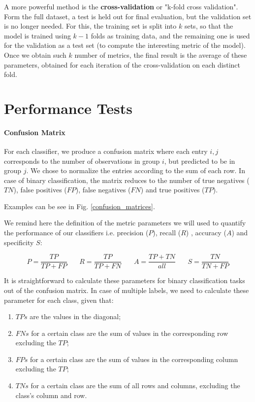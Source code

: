 \documentclass{article}
\begin{document}
A more powerful method is the \textbf{cross-validation} or "k-fold cross validation". Form the full dataset, a test is held out for final evaluation, but the validation set is no longer needed. For this, the training set is split into $k$ sets, so that the model is trained using $k-1$ folds as training data, and the remaining one is used for the validation as a test set (to compute the interesting metric of the model).
Once we obtain such $k$ number of metrics, the final result is the average of these parameters, obtained for each iteration of the cross-validation on each distinct fold. 


\section{Performance Tests}

\paragraph{Confusion Matrix}
For each classifier, we produce a confusion matrix where each entry $i,j$ corresponds to the number of observations in group $i$, but predicted to be in group $j$. We chose to normalize the entries according to the sum of each row.  
In case of binary classification, the matrix reduces to the number of true negatives ($TN$), false positives ($FP$), false negatives ($FN$) and true positives ($TP$). 

Examples can be see in Fig. \ref{confusion_matrices}.

We remind here the definition of the metric parameters we will used to quantify the performance of our classifiers i.e. precision ($P$), recall ($R$) , accuracy ($A$) and specificity $S$:

\begin{equation}
P = \frac{TP}{TP + FP} \ \ \ \ \ \ \ \  R = \frac{TP}{TP + FN} \ \ \ \ \ \ \ \  A = \frac{TP + TN}{all} 
\ \ \ \ \ \ \ \  S = \frac{TN}{TN + FP}
\end{equation}

It is straightforward to calculate these parameters for binary classification tasks out of the confusion matrix. In case of multiple labels, we need to calculate these parameter for each class, given that:
\begin{enumerate}
	\item  $TPs$ are the values in the diagonal; \
	\item  $FNs$ for a certain class are the sum of values in the corresponding row excluding the $TP$; \
	\item  $FPs$ for a certain class are the sum of values in the corresponding column excluding the $TP$; \
	\item  $TNs$ for a certain class are the sum of all rows and columns, excluding the class's column and row. \	
\end{enumerate}
\end{document}
